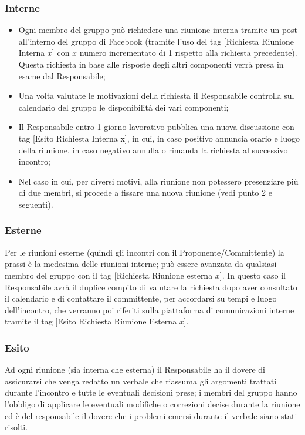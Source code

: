 	\subsubsection{Interne}{
		\begin{itemize}
			\item Ogni membro del gruppo pu\`{o} richiedere una riunione interna tramite un post all’interno del gruppo di Facebook (tramite l’uso del tag [Richiesta Riunione Interna $x$] con $x$ numero incrementato di 1 rispetto alla richiesta precedente). Questa richiesta  in base alle risposte degli altri componenti verr\`{a} presa in esame dal Responsabile;
			\item Una volta valutate le motivazioni della richiesta il Responsabile controlla sul calendario del gruppo le disponibilit\`{a} dei vari componenti;
			\item Il Responsabile entro 1 giorno lavorativo pubblica una nuova discussione con tag [Esito Richiesta Interna x], in cui, in caso positivo annuncia orario e luogo della riunione, in caso negativo annulla o rimanda la richiesta al successivo incontro;
			\item Nel caso in cui, per diversi motivi, alla riunione non potessero presenziare pi\`{u} di due membri, si procede a fissare una nuova riunione (vedi punto 2 e seguenti).
		\end{itemize}
	}
	\subsubsection{Esterne}{
		Per le riunioni esterne (quindi gli incontri con il Proponente/Committente) la prassi \`{e} la medesima delle riunioni interne; pu\`{o} essere avanzata da qualsiasi membro del gruppo con il tag [Richiesta Riunione esterna $x$].
		In questo caso il Responsabile avr\`{a} il duplice compito di valutare la richiesta dopo aver consultato il calendario e di contattare  il committente, per accordarsi su tempi e luogo dell’incontro, che verranno poi riferiti sulla piattaforma di comunicazioni interne tramite il tag [Esito Richiesta Riunione Esterna $x$].
		}
	\subsubsection{Esito}{
		Ad ogni riunione (sia interna che esterna) il Responsabile ha il dovere di assicurarsi che venga redatto un verbale che riassuma gli argomenti trattati durante l’incontro e tutte le eventuali decisioni prese; i membri del gruppo hanno l’obbligo di applicare le eventuali modifiche o correzioni decise durante la riunione ed \`{e} del responsabile il dovere che i problemi emersi durante il verbale siano stati risolti.
		}
		
